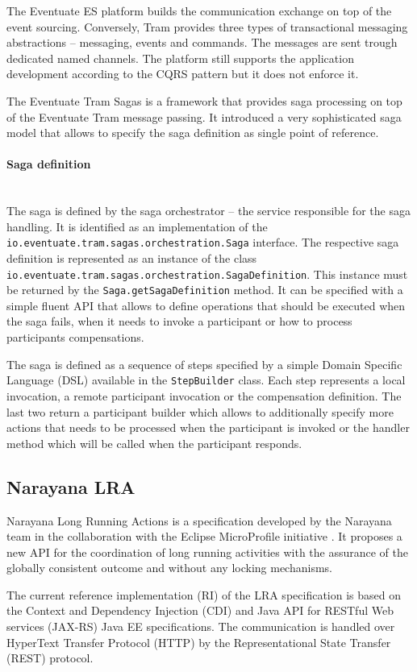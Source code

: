 \documentclass[oneside,
  digital, %
  table,   %
  nolof,     %
  nolot,     %
]{fithesis3}
\newcommand{\newlinepar}[1]{\paragraph{#1}\needspace{4\baselineskip}\mbox{}\\}
\begin{document}
The Eventuate ES platform builds the communication exchange on top of the event sourcing. Conversely, Tram provides three types of transactional messaging abstractions -- messaging, events and commands. The messages are sent trough dedicated named channels. The platform still supports the application development according to the CQRS pattern but it does not enforce it.

The Eventuate Tram Sagas is a framework that provides saga processing on top of the Eventuate Tram message passing. It introduced a very sophisticated saga model that allows to specify the saga definition as single point of reference. 

\newlinepar{Saga definition}

The saga is defined by the saga orchestrator -- the service responsible for the saga handling. It is identified as an implementation of the \texttt{io.eventuate.tram.sagas.orchestration.Saga} interface. The respective saga definition is represented as an instance of the class \texttt{io.eventuate.tram.sagas.orchestration.SagaDefinition}. This instance must be returned by the \texttt{Saga.getSagaDefinition} method. It can be specified with a simple fluent API that allows to define operations that should be executed when the saga fails, when it needs to invoke a participant or how to process participants compensations. 

The saga is defined as a sequence of steps specified by a simple Domain Specific Language (DSL) available in the \texttt{StepBuilder} class. Each step represents a local invocation, a remote participant invocation or the compensation definition. The last two return a participant builder which allows to additionally specify more actions that needs to be processed when the participant is invoked or the handler method which will be called when the participant responds.

\subsection{Narayana LRA}

Narayana Long Running Actions is a specification developed by the Narayana team in the collaboration with the Eclipse MicroProfile initiative \cite{saga-impl-comp}. It proposes a new API for the coordination of long running activities with the assurance of the globally consistent outcome and without any locking mechanisms.

The current reference implementation (RI) of the LRA specification is based on the Context and Dependency Injection (CDI) and Java API for RESTful Web services (JAX-RS) Java EE specifications. The communication is handled over HyperText Transfer Protocol (HTTP) by the Representational State Transfer (REST) protocol.
\end{document}
